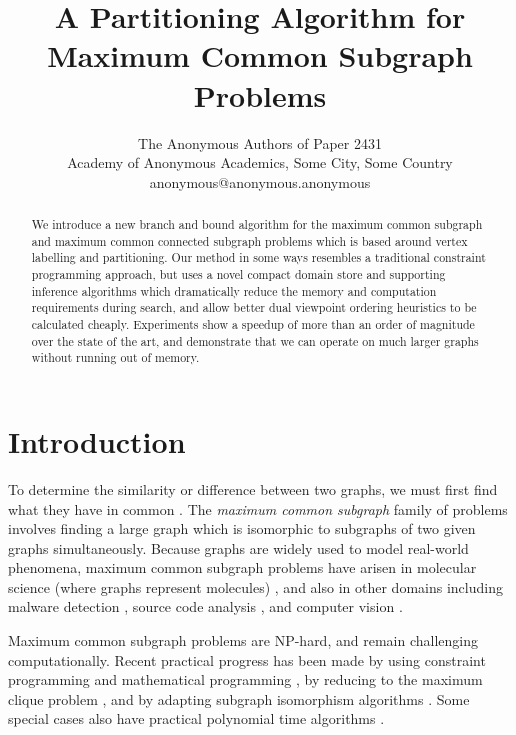 \documentclass[letterpaper]{article}
\title{A Partitioning Algorithm for Maximum Common Subgraph Problems}
\author{The Anonymous Authors of Paper 2431 \\
Academy of Anonymous Academics, Some City, Some Country \\
anonymous@anonymous.anonymous}
\newcommand{\citep}[1]{\cite{#1}}
\begin{document}
\maketitle

\begin{abstract}
    We introduce a new branch and bound algorithm for the maximum common
    subgraph and maximum common connected subgraph problems which is based
    around vertex labelling and partitioning. Our method in some ways resembles
    a traditional constraint programming approach, but uses a novel compact
    domain store and supporting inference algorithms which dramatically reduce
    the memory and computation requirements during search, and allow better
    dual viewpoint ordering heuristics to be calculated cheaply.  Experiments
    show a speedup of more than an order of magnitude over the state of the
    art, and demonstrate that we can operate on much larger graphs without
    running out of memory.
\end{abstract}

\section{Introduction}

To determine the similarity or difference between two graphs, we must first
find what they have in common
\citep{DBLP:journals/prl/Bunke97,DBLP:journals/prl/FernandezV01,KriegeThesis}.
The \emph{maximum common subgraph} family of problems involves finding a large
graph which is isomorphic to subgraphs of two given graphs simultaneously.
Because graphs are widely used to model real-world phenomena, maximum common
subgraph problems have arisen in molecular science (where graphs represent
molecules)
\citep{DBLP:journals/jcamd/RaymondW02a,Ehrlich:2011,DAM2014,Grindley1993707},
and also in other domains including malware detection
\citep{DBLP:journals/compsec/ParkRS13}, source code analysis
\cite{DBLP:journals/tkde/DjokoCH97}, and computer vision
\cite{DBLP:journals/jair/CookH94}.

Maximum common subgraph problems are NP-hard, and remain challenging
computationally. Recent practical progress has been made by using constraint
programming \citep{DBLP:conf/cp/NdiayeS11,DBLP:conf/cp/McCreeshNPS16} and
mathematical programming \citep{DBLP:journals/dam/BahienseMPS12}, by reducing
to the maximum clique problem \citep{LeviG,DBLP:conf/cp/McCreeshNPS16}, and by
adapting subgraph isomorphism algorithms \citep{UpcomingAAAIPaper}. Some
special cases also have practical polynomial time algorithms
\citep{DBLP:conf/mfcs/DroschinskyKM16,DBLP:conf/sofsem/DroschinskyKM17}.
\end{document}

